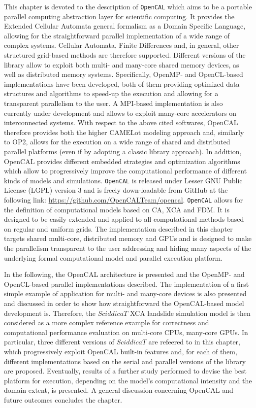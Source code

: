 This chapter is devoted to the description of \texttt{OpenCAL} which aims to be a portable parallel computing abstraction layer for scientific computing.
It provides the Extended Cellular Automata general formalism as a Domain
Specific Language, allowing for the straightforward parallel
implementation of a wide range of complex systems. Cellular
Automata, Finite Differences and, in general, other structured
grid-based methods are therefore supported. Different versions of
the library allow to exploit both multi- and many-core shared
memory devices, as well as distributed memory systems. Specifically,
OpenMP- and OpenCL-based implementations have been developed, both
of them providing optimized data structures and algorithms to
speed-up the execution and allowing for a transparent parallelism to
the user. A MPI-based implementation is also currently under
development and allows to exploit many-core accelerators on
interconnected systems. With respect to the above cited softwares,
OpenCAL therefore provides both the higher CAMELot modeling approach
and, similarly to OP2, allows for the execution on a wide range of
shared and distributed parallel platforms (even if by adopting a
classic library approach). In addition, OpenCAL provides different
embedded strategies and optimization algorithms which allow to
progressively improve the computational performance of different
kinds of models and simulations.
\texttt{OpenCAL} is released under Lesser GNU Public License (LGPL) version 3 and is freely down-loadable from GitHub at the following link: \url{https://github.com/OpenCALTeam/opencal}. \texttt{OpenCAL} allows for  the definition of computational models based on CA, XCA and FDM. It is designed to be easily extended and applied to all computational methods based on regular and uniform grids. 
The implementation described in this chapter targets shared multi-core, distributed memory and GPUs and is designed to make the parallelism transparent to the user addressing and hiding many aspects of the underlying formal computational model and parallel execution platform. 

In the following, the OpenCAL architecture is presented and the
OpenMP- and OpenCL-based parallel implementations described.  The implementation of a first simple example of
application for multi- and many-core devices is also
presented and discussed in order to show how straightforward the OpenCAL-based model development is. 
Therefore, the $SciddicaT$ XCA landslide simulation model
\cite{avolio2000simulation} is then considered as a more complex reference example for correctness and computational performance evaluation on multi-core
CPUs, many-core GPUs. In particular, three different versions of
$SciddicaT$ are refeered to in this chapter, which progressively exploit OpenCAL built-in features and, for each of them, different implementations based on the serial and parallel versions of the library are proposed. Eventually, results of a further study performed to devise the best platform for
execution, depending on the model's computational intensity and the
domain extent, is presented. A general discussion concerning OpenCAL
and future outcomes concludes the chapter.


